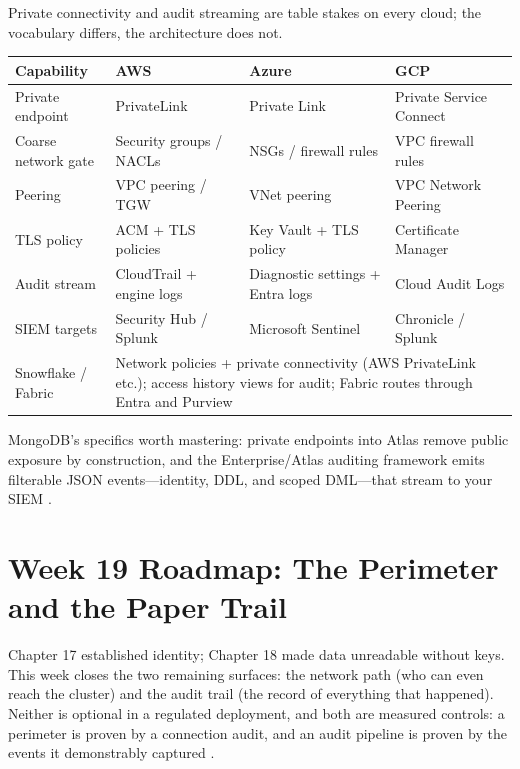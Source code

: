 \begin{crosscloud}
Private connectivity and audit streaming are table stakes on every cloud; the vocabulary differs, the architecture does not.

\vspace{2mm}
{\footnotesize
\begin{tabular}{@{}p{2.9cm}p{3.0cm}p{3.0cm}p{3.0cm}@{}} 
\toprule
\textbf{Capability} & \textbf{AWS} & \textbf{Azure} & \textbf{GCP} \\
\midrule
Private endpoint & PrivateLink & Private Link & Private Service Connect \\
Coarse network gate & Security groups / NACLs & NSGs / firewall rules & VPC firewall rules \\
Peering & VPC peering / TGW & VNet peering & VPC Network Peering \\
TLS policy & ACM + TLS policies & Key Vault + TLS policy & Certificate Manager \\
Audit stream & CloudTrail + engine logs & Diagnostic settings + Entra logs & Cloud Audit Logs \\
SIEM targets & Security Hub / Splunk & Microsoft Sentinel & Chronicle / Splunk \\
\addlinespace
Snowflake / Fabric & \multicolumn{3}{l}{Network policies + private connectivity (AWS PrivateLink etc.); access history views for audit; Fabric routes through Entra and Purview} \\
\bottomrule
\end{tabular}}

\vspace{1mm}
MongoDB's specifics worth mastering: private endpoints into Atlas remove public exposure by construction, and the Enterprise/Atlas auditing framework emits filterable JSON events---identity, DDL, and scoped DML---that stream to your SIEM \cite{mongodbPrivateLinkDocs,mongodbAuditingDocs}.
\end{crosscloud}

\section{Week 19 Roadmap: The Perimeter and the Paper Trail}
Chapter 17 established identity; Chapter 18 made data unreadable without keys. This week closes the two remaining surfaces: the network path (who can even reach the cluster) and the audit trail (the record of everything that happened). Neither is optional in a regulated deployment, and both are measured controls: a perimeter is proven by a connection audit, and an audit pipeline is proven by the events it demonstrably captured \cite{mongodbPrivateLinkDocs,mongodbAuditingDocs,mongodbTLSDocs}.

